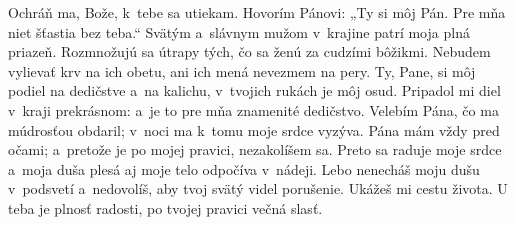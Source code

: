 Ochráň ma, Bože, k~tebe sa utiekam.
Hovorím Pánovi: „Ty si môj Pán.
Pre mňa niet šťastia bez teba.“
\versseparator
Svätým a~slávnym mužom v~krajine
patrí moja plná priazeň.
\versseparator
Rozmnožujú sa útrapy tých, čo sa ženú za cudzími bôžikmi.
\versseparator
Nebudem vylievať krv na ich obetu,
ani ich mená nevezmem na pery.
\versseparator
Ty, Pane, si môj podiel na dedičstve a~na kalichu,
v~tvojich rukách je môj osud.
\versseparator
Pripadol mi diel v~kraji prekrásnom:
a~je to pre mňa znamenité dedičstvo.
\versseparator
Velebím Pána, čo ma múdrosťou obdaril;
v~noci ma k~tomu moje srdce vyzýva.
\versseparator
Pána mám vždy pred očami;
a~pretože je po mojej pravici, nezakolíšem sa.
\versseparator
Preto sa raduje moje srdce
a~moja duša plesá
aj moje telo odpočíva v~nádeji.
\versseparator
Lebo nenecháš moju dušu v~podsvetí
a~nedovolíš, aby tvoj svätý videl porušenie.
\versseparator
Ukážeš mi cestu života.
U teba je plnosť radosti,
po tvojej pravici večná slasť.
